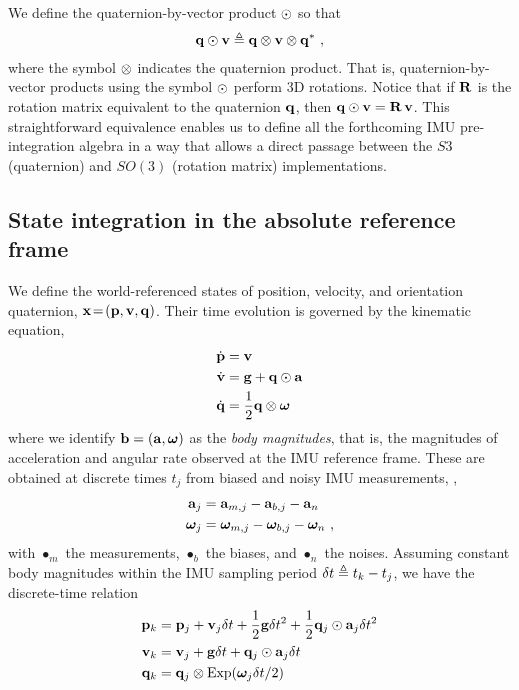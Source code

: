 We define the quaternion-by-vector product $\odot$ so that
%
\begin{align}
{\bf q}\odot{\bf v} \triangleq {\bf q}\otimes{\bf v}\otimes{\bf q}^*
~,
\end{align}
%
where the symbol $\otimes$ indicates the quaternion product.
That is, quaternion-by-vector products using the symbol $\odot$ perform 3D rotations. 
Notice that if ${\bf R}$ is the rotation matrix equivalent to the quaternion ${\bf q}$, then 
%
${\bf q}\odot{\bf v} = {\bf R}\,{\bf v}$. 
%
This straightforward equivalence
enables us to define all the forthcoming IMU pre-integration algebra in a way that allows a direct passage between the $S3$ (quaternion) and $SO(3)$ (rotation matrix) implementations.





\subsection{State integration in the absolute reference frame}

We define the world-referenced states of position, velocity, and orientation quaternion, ${\bf x}\!=\!({\bf p},{\bf v},{\bf q})$. 
Their time evolution is governed by the kinematic equation,
%
\begin{align}\label{equ:cont_basic}
\begin{split}
\dot{{\bf p}} &= {\bf v} \\
\dot{{\bf v}} &= {\bf g} + {\bf q}\odot{\bf a} \\
\dot{{\bf q}} &= \frac12{\bf q}\otimes{{\bm \omega}} 
\end{split}
\end{align}
%
where we identify ${\bf b}=({\bf a},{{\bm \omega}})$ as the \emph{body magnitudes}, that is, the magnitudes of acceleration and angular rate observed at the IMU reference frame. These are obtained at discrete times $t_j$ from biased and noisy IMU measurements, \ie,
%
\begin{align}\label{equ:body}
\begin{split}
{\bf a}_j &= {\bf a}_{m,j} - {\bf a}_{b,j} - {\bf a}_n \\
{{\bm \omega}}_j  &= {{\bm \omega}}_{m,j}  - {{\bm \omega}}_{b,j}  - {{\bm \omega}}_n 
~,
\end{split}
\end{align}
%
with $\bullet_m$ the measurements, $\bullet_b$ the biases, and $\bullet_n$ the noises.
Assuming constant body magnitudes within the IMU sampling period $\delta t\triangleq t_k-t_j$, we have the discrete-time relation
%
\begin{align}\label{equ:integration_state}
\begin{split}
{\bf p}_{k} &= {\bf p}_j + {\bf v}_j\delta t  + \frac12{\bf g}\delta t^2 + \frac12{\bf q}_j\odot{\bf a}_j\delta t^2 \\
{\bf v}_{k} &= {\bf v}_j + {\bf g}\delta t + {\bf q}_j\odot{\bf a}_j\delta t \\
{\bf q}_{k} &= {\bf q}_j\otimes\operatorname*{Exp}({{\bm \omega}}_j\delta t/2) 
\end{split}
\end{align}


